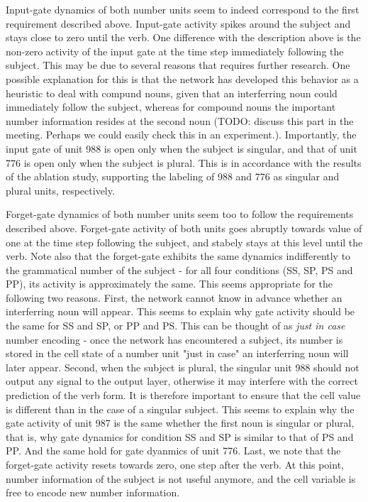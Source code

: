 Input-gate dynamics of both number units seem to indeed correspond to the first requirement described above. Input-gate activity spikes around the subject and stays close to zero until the verb. One difference with the description above is the non-zero activity of the input gate at the time step immediately following the subject. This may be due to several reasons that requires further research. One possible explanation for this is that the network has developed this behavior as a heuristic to deal with compund nouns, given that an interferring noun could immediately follow the subject, whereas for compound nouns the important number information resides at the second noun (TODO: discuss this part in the meeting. Perhaps we could easily check this in an experiment.). Importantly, the input gate of unit 988 is open only when the subject is singular, and that of unit 776 is open only when the subject is plural. This is in accordance with the results of the ablation study, supporting the labeling of 988 and 776 as singular and plural units, respectively. 

Forget-gate dynamics of both number units seem too to follow the requirements described above. Forget-gate activity of both units goes abruptly towards value of one at the time step following the subject, and stabely stays at this level until the verb. Note also that the forget-gate exhibits the same dynamics indifferently to the grammatical number of the subject - for all four conditions (SS, SP, PS and PP), its activity is approximately the same. This seems appropriate for the following two reasons. First, the network cannot know in advance whether an interferring noun will appear. This seems to explain why gate activity should be the same for SS and SP, or PP and PS. This can be thought of as \textit{just in case} number encoding - once the network has encountered a subject, its number is stored in the cell state of a number unit "just in case" an interferring noun will later appear. Second, when the subject is plural, the singular unit 988 should not output any signal to the output layer, otherwise it may interfere with the correct prediction of the verb form. It is therefore important to ensure that the cell value is different than in the case of a singular subject. This seems to explain why the gate activity of unit 987 is the same whether the first noun is singular or plural, that is, why gate dynamics for condition SS and SP is similar to that of PS and PP. And the same hold for gate dyanmics of unit 776. Last, we note that the forget-gate activity resets towards zero, one step after the verb. At this point, number information of the subject is not useful anymore, and the cell variable is free to encode new number information. 
 
